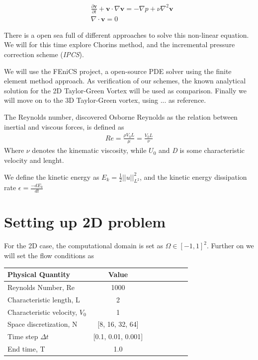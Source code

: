 \documentclass[a4paper,norsk]{article}
\begin{document}
\begin{align}
&\frac{\partial \textbf{v}}{\partial t} + \textbf{v} \cdot \nabla \textbf{v} =
-\nabla p + \nu \nabla^2 \textbf{v} \\
&\nabla \cdot \textbf{v} = 0
\end{align}

There is a open sea full of different approaches to solve this non-linear equation. We will for this
time explore Chorins method, and the incremental pressure correction scheme (\textit{IPCS}).

We will use the FEniCS project, a open-source PDE solver using the finite element method approach.
As verification of our schemes, the known analytical solution for the 2D Taylor-Green Vortex will be used as comparison.
Finally we will move on to the 3D Taylor-Green vortex, using ... as reference.

The Reynolds number, discovered Osborne Reynolds as the relation between inertial and viscous forces, is defined
as
\begin{align}
Re = \frac{\rho V_{0} L}{\mu} = \frac{V_{0} L}{\nu}
\end{align}
Where $\nu$ denotes the kinematic viscosity, while $U_{0}$ and \textit{D} is some characteristic velocity and lenght.

We define the kinetic energy as $E_k = \frac{1}{2}||u||^2_{L^2}$, and the kinetic energy dissipation rate $\epsilon = \frac{-d E_k}{dt}$

\newpage
\section*{Setting up 2D problem}

For the 2D case, the computational domain is set as $\Omega \in [-1, 1]^2$. Further on we will set
the flow conditions as \\

\begin{tabular}{l*{6}{c}r}
Physical Quantity              & Value  \\
\hline
Reynolds Number, Re & 1000   \\
Characteristic length, L           & 2     \\
Characteristic velocity, $V_{0}$   & 1     \\
Space discretization, N & [8, 16, 32, 64] \\
Time step $\Delta t$ 			   & [0.1, 0.01, 0.001] \\
End time, T 					   & 1.0
\end{tabular}
\end{document}
